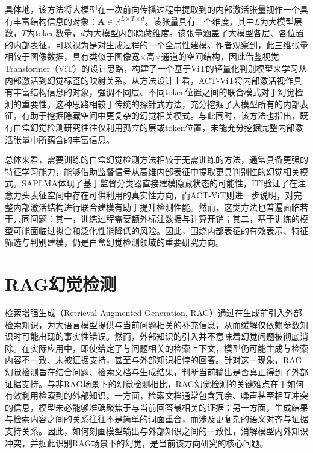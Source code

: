 具体地，该方法将大模型在一次前向传播过程中提取到的内部激活张量视作一个具有丰富结构信息的对象：$\mathbf{A}\in\mathbb{R}^{L\times T\times d}$。该张量具有三个维度，其中$L$为大模型层数，$T$为token数量，$d$为大模型内部隐藏维度。该张量涵盖了大模型各层、各位置的内部表征，可以视为是对生成过程的一个全局性建模。作者观察到，此三维张量相较于图像数据，具有类似于图像宽$\times$高$\times$通道的空间结构，因此借鉴视觉Transformer（ViT）的设计思路，构建了一个基于ViT的轻量化判别模型来学习从内部激活到幻觉标签的映射关系。从方法设计上看，ACT-ViT将内部激活视作具有丰富结构信息的对象，强调不同层、不同token位置之间的联合模式对于幻觉检测的重要性。这种思路相较于传统的探针式方法，充分挖掘了大模型所有的内部表征，有助于挖掘隐藏空间中更复杂的幻觉相关模式。与此同时，该方法也指出，既有白盒幻觉检测研究往往仅利用孤立的层或token位置，未能充分挖掘完整内部激活张量中所蕴含的丰富信息。

总体来看，需要训练的白盒幻觉检测方法相较于无需训练的方法，通常具备更强的特征学习能力，能够借助监督信号从高维内部表征中提取更具判别性的幻觉相关模式。SAPLMA体现了基于监督分类器直接建模隐藏状态的可能性，ITI验证了在注意力头表征空间中存在可供利用的真实性方向，而ACT-ViT则进一步说明，对完整内部激活结构进行联合建模有助于提升检测性能。然而，这类方法也普遍面临若干共同问题：其一，训练过程需要额外标注数据与计算开销；其二，基于训练的模型可能面临过拟合和泛化性能降低的风险。因此，围绕内部表征的有效表示、特征筛选与判别建模，仍是白盒幻觉检测领域的重要研究方向。

\section{RAG幻觉检测}\label{sec:rag_hallucination_detection}


检索增强生成（Retrieval-Augmented Generation, RAG）通过在生成前引入外部检索知识，为大语言模型提供与当前问题相关的补充信息，从而缓解仅依赖参数知识时可能出现的事实性错误。然而，外部知识的引入并不意味着幻觉问题被彻底消除。在实际应用中，即使给定了与问题相关的检索上下文，模型仍可能生成与检索内容不一致、未被证据支持，甚至与外部知识相悖的回答。针对这一现象，RAG幻觉检测旨在结合问题、检索文档与生成结果，判断当前输出是否真正得到了外部证据支持。与非RAG场景下的幻觉检测相比，RAG幻觉检测的关键难点在于如何有效利用检索到的外部知识。一方面，检索文档通常包含冗余、噪声甚至相互冲突的信息，模型未必能够准确聚焦于与当前回答最相关的证据；另一方面，生成结果与检索内容之间的关系往往不是简单的词面重合，而涉及更复杂的语义对齐与证据支持关系。因此，如何刻画模型输出与外部知识之间的一致性，消解模型内外知识冲突，并据此识别RAG场景下的幻觉，是当前该方向研究的核心问题。

